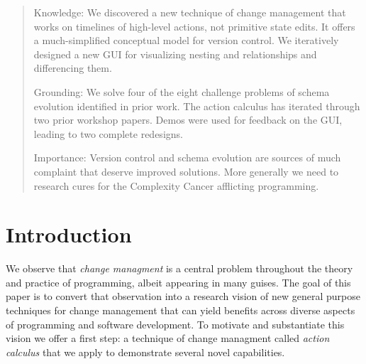 \documentclass[english,submission]{programming}
\theoremstyle{definition}
\begin{document}
\begin{abstract}
Knowledge: We discovered a new technique of change management that works on timelines of high-level actions, not primitive state edits. It offers a much-simplified conceptual model for version control. We iteratively designed a new GUI for visualizing nesting and relationships and differencing them.

Grounding: We solve four of the eight challenge problems of schema evolution identified in prior work.
The action calculus has iterated through two prior workshop papers. Demos were used for feedback on the GUI, leading to two complete redesigns.

Importance: Version control and schema evolution are sources of much complaint that deserve improved solutions. More generally we need to research cures for the Complexity Cancer afflicting programming.

\end{abstract}






\section{Introduction}

We observe that \textit{change managment} is a central problem throughout the theory and practice of programming, albeit appearing in many guises. The goal of this paper is to convert that observation into a research vision of new general purpose techniques for change management that can yield benefits across diverse aspects of programming and software development. To motivate and substantiate this vision we offer a first step: a technique of change managment called \textit{action calculus} that we apply to demonstrate several novel capabilities.
\end{document}

